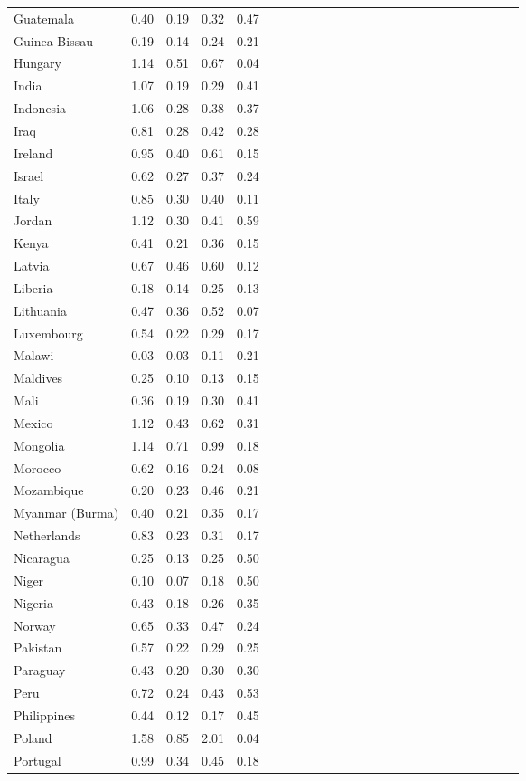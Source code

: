 \begin{ThreePartTable}
\begin{longtable}[t]{l|r|rrrl|r|rrrl|r|rrrl|r|rrrl|r|rrr}
Guatemala & 0.40 & 0.19 & 0.32 & 0.47\\
Guinea-Bissau & 0.19 & 0.14 & 0.24 & 0.21\\
Hungary & 1.14 & 0.51 & 0.67 & 0.04\\
India & 1.07 & 0.19 & 0.29 & 0.41\\
Indonesia & 1.06 & 0.28 & 0.38 & 0.37\\
Iraq & 0.81 & 0.28 & 0.42 & 0.28\\
Ireland & 0.95 & 0.40 & 0.61 & 0.15\\
Israel & 0.62 & 0.27 & 0.37 & 0.24\\
Italy & 0.85 & 0.30 & 0.40 & 0.11\\
Jordan & 1.12 & 0.30 & 0.41 & 0.59\\
Kenya & 0.41 & 0.21 & 0.36 & 0.15\\
Latvia & 0.67 & 0.46 & 0.60 & 0.12\\
Liberia & 0.18 & 0.14 & 0.25 & 0.13\\
Lithuania & 0.47 & 0.36 & 0.52 & 0.07\\
Luxembourg & 0.54 & 0.22 & 0.29 & 0.17\\
Malawi & 0.03 & 0.03 & 0.11 & 0.21\\
Maldives & 0.25 & 0.10 & 0.13 & 0.15\\
Mali & 0.36 & 0.19 & 0.30 & 0.41\\
Mexico & 1.12 & 0.43 & 0.62 & 0.31\\
Mongolia & 1.14 & 0.71 & 0.99 & 0.18\\
Morocco & 0.62 & 0.16 & 0.24 & 0.08\\
Mozambique & 0.20 & 0.23 & 0.46 & 0.21\\
Myanmar (Burma) & 0.40 & 0.21 & 0.35 & 0.17\\
Netherlands & 0.83 & 0.23 & 0.31 & 0.17\\
Nicaragua & 0.25 & 0.13 & 0.25 & 0.50\\
Niger & 0.10 & 0.07 & 0.18 & 0.50\\
Nigeria & 0.43 & 0.18 & 0.26 & 0.35\\
Norway & 0.65 & 0.33 & 0.47 & 0.24\\
Pakistan & 0.57 & 0.22 & 0.29 & 0.25\\
Paraguay & 0.43 & 0.20 & 0.30 & 0.30\\
Peru & 0.72 & 0.24 & 0.43 & 0.53\\
Philippines & 0.44 & 0.12 & 0.17 & 0.45\\
Poland & 1.58 & 0.85 & 2.01 & 0.04\\
Portugal & 0.99 & 0.34 & 0.45 & 0.18\\

\end{longtable}
\end{ThreePartTable}
